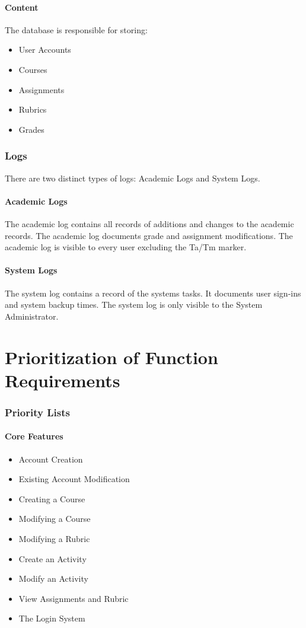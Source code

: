 \documentclass{article}
\begin{document}
\subsection{Content}
The database is responsible for storing:
\begin{itemize}
\item User Accounts
\item Courses
\item Assignments
\item Rubrics
\item Grades
\end{itemize}

\section{Logs}
There are two distinct types of logs: Academic Logs and System Logs.
\subsection{Academic Logs}
The academic log contains all records of additions and changes to the academic records.
The academic log documents grade and assignment modifications.  The academic log
is visible to every user excluding the Ta/Tm marker.
\subsection{System Logs}
The system log contains a record of the systems tasks.  It documents user sign-ins
and system backup times. The system log is only visible to the System Administrator.

\part{Prioritization of Function Requirements}
\section{Priority Lists}
\subsection{Core Features}
\begin{itemize}
  \item Account Creation
  \item Existing Account Modification
  \item Creating a Course
  \item Modifying a Course
  \item Modifying a Rubric
  \item Create an Activity
  \item Modify an Activity
  \item View Assignments and Rubric
  \item The Login System
\end{itemize}
\end{document}
